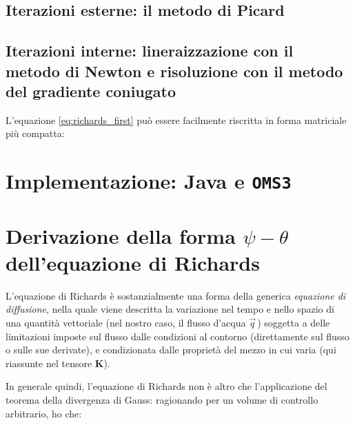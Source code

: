 \documentclass[11pt]{amsart}
\theoremstyle{definition}
\theoremstyle{remark}
\numberwithin{equation}{section}
\begin{document}
 \subsection{Iterazioni esterne: il metodo di Picard}
 \label{subsec:extern}

 \subsection{Iterazioni interne: lineraizzazione con il metodo di Newton e risoluzione con il metodo del gradiente coniugato}
 \label{subsec:intern}

L'equazione \ref{eq:richards_first} può essere facilmente riscritta in forma matriciale più compatta:









 



\section{Implementazione: Java e \texttt{OMS3}}
\label{sec:implementation}



\newpage
\appendix
\setcounter{equation}{0}
\section{Derivazione della forma $\psi-\theta$ dell'equazione di Richards}
\label{appendix:richards}
L'equazione di Richards è sostanzialmente una forma della generica \emph{equazione di diffusione}, nella quale viene descritta la variazione nel tempo e nello spazio di una quantità vettoriale (nel nostro caso, il flusso d'acqua $\vec{q}$\,) soggetta a delle limitazioni imposte sul flusso dalle condizioni al contorno (direttamente sul flusso o sulle sue derivate), e condizionata dalle proprietà del mezzo in cui varia (qui riassunte nel tensore $\mathbf{K}$).


In generale quindi, l'equazione di Richards non è altro che l'applicazione del teorema della divergenza di Gauss: ragionando per un volume di controllo arbitrario, ho che:
\end{document}
